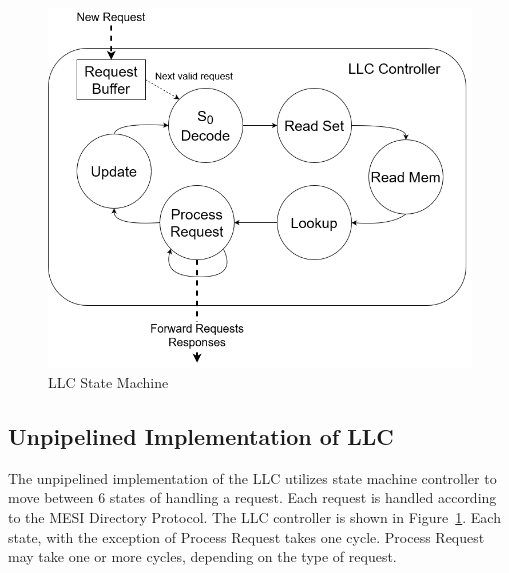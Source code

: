 \documentclass{sig-alternate}
\begin{document}
\begin{figure}[h]
  \centering
  \captionsetup{justification=centering, format=hang}
  \includegraphics[width=1\columnwidth]{fig/LLC_Core_FSM_fa22.png}
  \caption{LLC State Machine}
  \label{fig:llc_fsm}
  \end{figure}

\subsection{Unpipelined Implementation of LLC} %
The unpipelined implementation of the LLC utilizes state machine controller to move between 6 states of handling a request. Each request is handled according to the MESI Directory Protocol.
 The LLC controller is shown in Figure~\ref{fig:llc_fsm}. Each state, with the exception of Process Request takes one cycle. Process Request may take one or more cycles, depending on the type of request.
\end{document}
